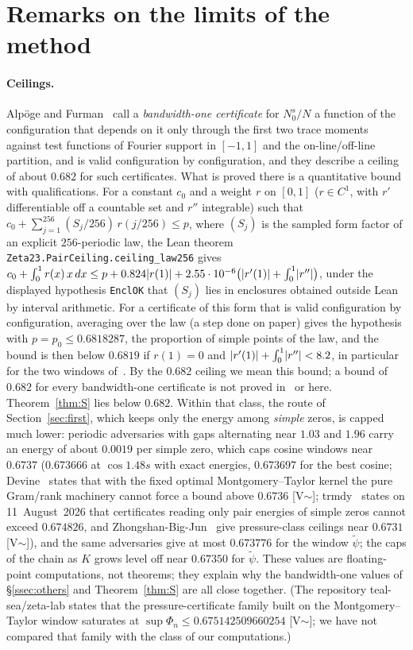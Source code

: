 \section{Remarks on the limits of the method}\label{sec:remarks}

\paragraph{Ceilings.} Alp\"oge and Furman~\cite[\S7.2]{AF} call a \emph{bandwidth-one certificate} for $N_0^s/N$ a function of the
configuration that depends on it only through the first two trace moments against test functions of Fourier support in $[-1,1]$ and the
on-line/off-line partition, and is valid configuration by configuration, and they describe a ceiling of about $0.682$ for such certificates.
What is proved there is a quantitative bound with qualifications. For a constant $c_0$ and a weight $r$ on $[0,1]$ ($r\in C^1$, with $r'$
differentiable off a countable set and $r''$ integrable) such that $c_0+\sum_{j=1}^{256}(S_j/256)\,r(j/256)\le p$, where
$(S_j)$ is the sampled form factor of an explicit $256$-periodic law, the Lean theorem \texttt{Zeta23.\allowbreak PairCeiling.\allowbreak ceiling\_law256}
gives $c_0+\int_0^1r(x)\,x\,dx\le p+0.824\lvert r(1)\rvert+2.55\cdot10^{-6}\big(\lvert r'(1)\rvert+\int_0^1\lvert r''\rvert\big)$, under the displayed
hypothesis \texttt{EnclOK} that $(S_j)$ lies in enclosures obtained outside Lean by interval arithmetic. For a certificate of this form that
is valid configuration by configuration, averaging over the law (a step done on paper) gives the hypothesis with $p=p_0\le0.6818287$, the
proportion of simple points of the law, and the bound is then below $0.6819$ if $r(1)=0$ and $\lvert r'(1)\rvert+\int_0^1\lvert r''\rvert<8.2$, in
particular for the two windows of~\cite[(2.6)]{AF}. By the $0.682$ ceiling we mean this bound; a bound of $0.682$ for every bandwidth-one
certificate is not proved in~\cite{AF} or here. Theorem~\ref{thm:S} lies below $0.682$. Within that class, the route of Section~\ref{sec:first}, which keeps only the energy among
\emph{simple} zeros, is capped much lower: periodic adversaries with gaps alternating near $1.03$ and $1.96$ carry an energy of about $0.0019$ per
simple zero, which caps cosine windows near $0.6737$ ($0.673666$ at $\cos1.48s$ with exact energies, $0.673697$ for the best cosine; Devine~\cite{Devine22066689}
states that with the fixed optimal Montgomery--Taylor kernel the pure Gram/rank machinery cannot force a bound above $0.6736$ [V$\sim$]; \mbox{trmdy}~\cite{trmdy} states on 11~August~2026 that certificates reading only pair
energies of simple zeros cannot exceed $0.674826$, and Zhongshan-Big-Jun~\cite{Zhongshan} give pressure-class ceilings near $0.6731$
[V$\sim$]), and the
same adversaries give at most $0.673776$ for the window $\tilde\psi$; the caps of the chain as $K$ grows level off near $0.67350$ for $\tilde\psi$.
These values are floating-point computations, not theorems; they explain why the bandwidth-one values of \S\ref{ssec:others} and
Theorem~\ref{thm:S} are all close together. (The repository teal-sea/zeta-lab states that the pressure-certificate family built on the Montgomery--Taylor window saturates at
$\sup\Phi_n\le0.675142509660254$ [V$\sim$]; we have not compared that family with the class of our computations.)

